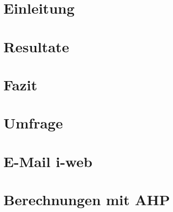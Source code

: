 \documentclass[12pt, a4paper, twoside]{report}
\title{}
\author{}
\date{\today}
\begin{document}
\sloppy



 
\renewcommand{\contentsname}{Inhaltsverzeichnis}
\renewcommand{\listfigurename}{Abbildungsverzeichnis}

\renewcommand{\listtablename}{Tabellenverzeichnis}

\renewcommand{\figurename}{Abbildung}
\renewcommand{\tablename}{Tabelle}
\tableofcontents

\glsaddall


\printglossary[title=Glossar, toctitle=Glossar,nonumberlist]

\chapter{Einleitung}


\chapter{Resultate}


\chapter{Fazit}


\printbibliography[title={Literaturverzeichnis}, heading=bibintoc]

\listoffigures

\listoftables

\appendix
\chapter{Umfrage}

\chapter{E-Mail i-web}

\chapter{Berechnungen mit AHP}

\end{document}
